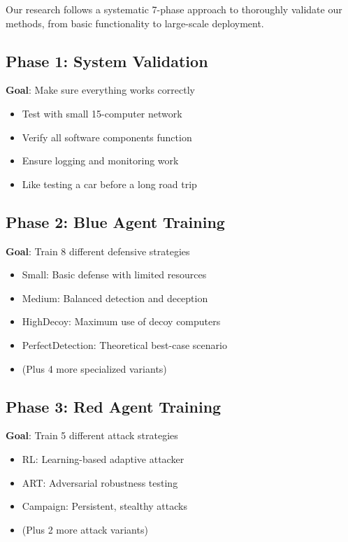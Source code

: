 \documentclass[11pt]{article}
\begin{document}
\begin{foundation}
Our research follows a systematic 7-phase approach to thoroughly validate our methods, from basic functionality to large-scale deployment.
\end{foundation}

\subsection{Phase 1: System Validation}
\begin{intuition}
\textbf{Goal}: Make sure everything works correctly
\begin{itemize}
\item Test with small 15-computer network
\item Verify all software components function
\item Ensure logging and monitoring work
\item Like testing a car before a long road trip
\end{itemize}
\end{intuition}

\subsection{Phase 2: Blue Agent Training}
\begin{intuition}
\textbf{Goal}: Train 8 different defensive strategies
\begin{itemize}
\item Small: Basic defense with limited resources
\item Medium: Balanced detection and deception
\item HighDecoy: Maximum use of decoy computers
\item PerfectDetection: Theoretical best-case scenario
\item (Plus 4 more specialized variants)
\end{itemize}
\end{intuition}

\subsection{Phase 3: Red Agent Training}
\begin{intuition}
\textbf{Goal}: Train 5 different attack strategies
\begin{itemize}
\item RL: Learning-based adaptive attacker
\item ART: Adversarial robustness testing
\item Campaign: Persistent, stealthy attacks
\item (Plus 2 more attack variants)
\end{itemize}
\end{intuition}
\end{document}
